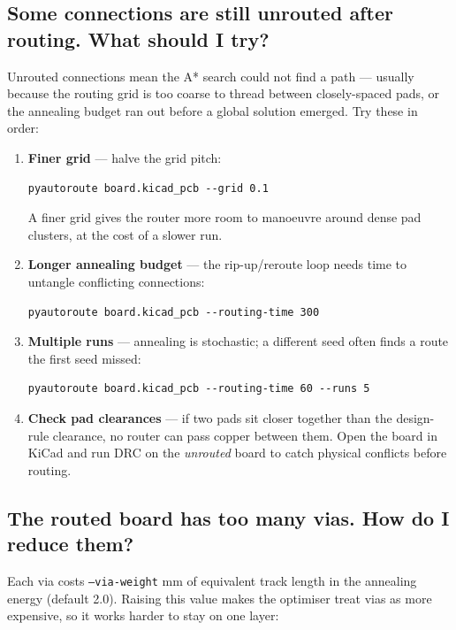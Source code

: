 \documentclass[11pt,a4paper]{article}
\begin{document}
\subsection*{Some connections are still unrouted after routing. What should I try?}

Unrouted connections mean the A* search could not find a path --- usually
because the routing grid is too coarse to thread between closely-spaced
pads, or the annealing budget ran out before a global solution emerged.
Try these in order:

\begin{enumerate}
    \item \textbf{Finer grid} --- halve the grid pitch:
\begin{lstlisting}
pyautoroute board.kicad_pcb --grid 0.1
\end{lstlisting}
          A finer grid gives the router more room to manoeuvre around
          dense pad clusters, at the cost of a slower run.
    \item \textbf{Longer annealing budget} --- the rip-up/reroute loop
          needs time to untangle conflicting connections:
\begin{lstlisting}
pyautoroute board.kicad_pcb --routing-time 300
\end{lstlisting}
    \item \textbf{Multiple runs} --- annealing is stochastic; a different
          seed often finds a route the first seed missed:
\begin{lstlisting}
pyautoroute board.kicad_pcb --routing-time 60 --runs 5
\end{lstlisting}
    \item \textbf{Check pad clearances} --- if two pads sit closer
          together than the design-rule clearance, no router can pass
          copper between them. Open the board in KiCad and run DRC on
          the \emph{unrouted} board to catch physical conflicts before
          routing.
\end{enumerate}

\subsection*{The routed board has too many vias. How do I reduce them?}

Each via costs \texttt{--via-weight} mm of equivalent track length in the
annealing energy (default 2.0). Raising this value makes the optimiser
treat vias as more expensive, so it works harder to stay on one layer:
\end{document}
